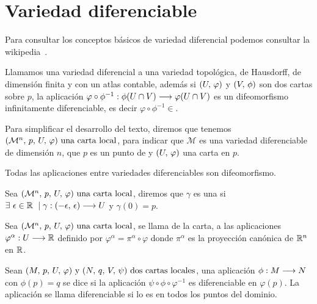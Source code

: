 \section{Variedad diferenciable}\label{sec:variedad-diferenciable}
Para consultar los conceptos básicos de variedad diferencial podemos consultar la
wikipedia~\cite{wiki:variedad-diferenciable}.

Llamamos una variedad diferencial a una variedad topológica, de Hausdorff, de dimensión finita y con un atlas
contable, además si $(U,\thinspace\varphi)$ y $(V,\thinspace\phi)$ son dos cartas sobre $p$, la aplicación
$\varphi\circ\phi^{-1}:\phi(U\cap V)\longrightarrow \varphi(U\cap V)$ es un difeomorfismo infinitamente diferenciable, es
decir $\varphi\circ\phi^{-1}\in$.

Para simplificar el desarrollo del texto, diremos que tenemos $(\mathcal{M}^n,\thinspace p,\thinspace U,\thinspace \varphi)\textmd{ una carta local}$, para indicar que $\mathcal{M}$ es una
variedad diferenciable de dimensión $n$, que $p$ es un punto de
 y $(U,\thinspace\varphi)$ una carta en $p$.

Todas las aplicaciones entre variedades diferenciables son difeomorfismo.

\begin{definition}
  Sea $(\mathcal{M}^n,\thinspace p,\thinspace U,\thinspace \varphi)\textmd{ una carta local}$, diremos que $\gamma$ es una \label{curva-centrada} si $\exists\ \epsilon\in\mathbb{R} \ \mid \gamma:(-\epsilon,\thinspace\epsilon)\longrightarrow U$ y
  $\gamma(0)=p$.
\end{definition}

\begin{definition}
  Sea $(\mathcal{M}^n,\thinspace p,\thinspace U,\thinspace \varphi)\textmd{ una carta local}$, se llama  de la carta, a las aplicaciones
  $\varphi^\alpha:U\longrightarrow \mathbb{R}$ definido por $\varphi^\alpha=\pi^\alpha\circ\varphi$ donde $\pi^\alpha$ es la
  proyección canónica de $\mathbb{R}^n$ en $\mathbb{R}$.
\end{definition}

\begin{definition}
  Sean $(M,\thinspace p,\thinspace U,\thinspace\varphi)\textmd{ y } (N,\thinspace q,\thinspace V,\thinspace\psi)\textmd{ dos cartas locales}$, una aplicación
  $\phi:M\longrightarrow N$ con $\phi(p)=q$ se dice
   si la aplicación
  $\psi\circ \phi\circ\varphi^{-1}$ es diferenciable en $\varphi(p)$.
  La aplicación se llama diferenciable si lo es en todos los puntos del dominio.
\end{definition}

